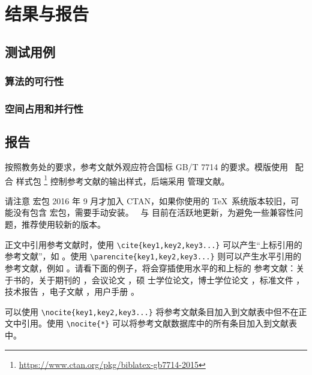 
\chapter{结果与报告}

\section{测试用例}

\subsection{算法的可行性}



\subsection{空间占用和并行性}



\section{报告}

按照教务处的要求，参考文献外观应符合国标 GB/T 7714 的要求。模版使用 \BibLaTeX\
配合  样式包
\footnote{\url{https://www.ctan.org/pkg/biblatex-gb7714-2015}}
控制参考文献的输出样式，后端采用  管理文献。

请注意  宏包 2016 年 9 月才加入 CTAN，如果你使用的
\TeX\ 系统版本较旧，可能没有包含  宏包，需要手动安装。
\BibLaTeX\ 与 \pkg{biblatex-gb7714-2015} 目前在活跃地更新，为避免一些兼容性问
题，推荐使用较新的版本。

正文中引用参考文献时，使用 \verb|\cite{key1,key2,key3...}| 可以产生“上标引用的
参考文献”，如 \cite{Meta_CN,chen2007act,DPMG}。使用
\verb|\parencite{key1,key2,key3...}| 则可以产生水平引用的参考文献，例如
\parencite{JohnD,zhubajie,IEEE-1363}。请看下面的例子，将会穿插使用水平的和上标的
参考文献：关于书的\parencite{Meta_CN,JohnD,IEEE-1363}，关于期刊的
\cite{chen2007act,chen2007ewi}，会议论文 \parencite{DPMG,kocher99,cnproceed}，硕
士学位论文\parencite{zhubajie,metamori2004}，博士学位论文
\cite{shaheshang,FistSystem01,bai2008}，标准文件 \parencite{IEEE-1363}，技术报告
\cite{NPB2}，电子文献 \parencite{xiaoyu2001, CHRISTINE1998}，用户手册
\parencite{RManual}。

可以使用 \verb|\nocite{key1,key2,key3...}| 将参考文献条目加入到文献表中但不在正
文中引用。使用 \verb|\nocite{*}| 可以将参考文献数据库中的所有条目加入到文献表
中。
